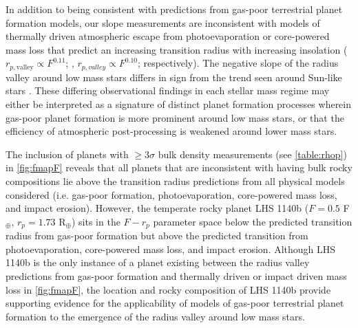 \documentclass[twocolumn]{emulateapj}
\begin{document}
In addition to being consistent with predictions from gas-poor terrestrial planet formation models,
our slope measurements are inconsistent with models of thermally driven atmospheric
escape from photoevaporation or core-powered mass loss that predict
an increasing transition radius with increasing insolation ($r_{p,\text{valley}} \propto F^{0.11}$; \citealt{lopez18},  
$r_{p,valley} \propto F^{0.10}$; \citealt{gupta19b} respectively).
The negative slope of the radius valley around low mass stars differs in sign from the trend seen around
Sun-like stars \citep[$r_{p,\text{valley}}\propto F^{0.12\pm 0.02}, r_{p,\text{valley}}\propto P^{-0.11\pm 0.03}$;][]{martinez19}.
These differing observational findings in each stellar mass regime may either be interpreted as
a signature of distinct planet formation processes wherein gas-poor planet formation is more prominent
around low mass stars, or that the efficiency of atmospheric post-processing is weakened around lower mass stars.

The inclusion of planets with $\geq 3\sigma$ bulk density measurements (see \autoref{table:rhop}) in
\autoref{fig:fmapF} reveals that all planets that are inconsistent with having bulk rocky
compositions lie above the transition radius predictions from all physical models considered
(i.e. gas-poor formation, photoevaporation, core-powered mass loss, and impact erosion). However, the
temperate rocky planet LHS 1140b ($F=0.5$ F$_{\oplus}$, $r_p=1.73$ R$_{\oplus}$) sits in the $F-r_p$ parameter
space below the predicted transition radius from gas-poor formation but above the predicted transition from
photoevaporation, core-powered mass loss, and impact erosion. Although LHS 1140b is the only instance of a planet
existing between the radius valley predictions from gas-poor formation and thermally driven or impact driven
mass loss in \autoref{fig:fmapF}, the location and rocky composition of LHS 1140b
provide supporting evidence for the applicability of models of 
gas-poor terrestrial planet formation to the emergence of the radius valley around low mass stars.
\end{document}
